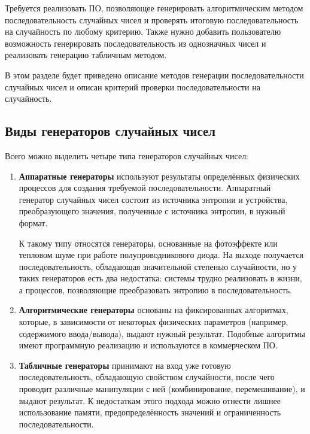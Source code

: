 Требуется реализовать ПО, позволяющее генерировать алгоритмическим методом последовательность случайных чисел и проверять итоговую последовательность на случайность по любому критерию.
Также нужно добавить пользователю возможность генерировать последовательность из однозначных чисел и реализовать генерацию табличным методом.

В этом разделе будет приведено описание методов генерации последовательности случайных чисел и описан критерий проверки последовательности на случайность.

\subsection*{Виды генераторов случайных чисел}
Всего можно выделить четыре типа генераторов случайных чисел:
\begin{enumerate}
	\item \textbf{Аппаратные генераторы} используют результаты определённых физических процессов для создания требуемой последовательности. Аппаратный генератор случайных чисел состоит из источника энтропии и устройства, преобразующего значения, полученные с источника энтропии, в нужный формат.
	
	К такому типу относятся генераторы, основанные на фотоэффекте или тепловом шуме при работе полупроводникового диода. 
	На выходе получается последовательность, обладающая значительной степенью случайности, но у таких генераторов есть два недостатка: системы трудно реализовать в жизни, а процессов, позволяющие преобразовать энтропию в последовательность.
	
	\item \textbf{Алгоритмические генераторы} основаны на фиксированных алгоритмах, которые, в зависимости от некоторых физических параметров (например, содержимого ввода/вывода), выдают нужный результат. Подобные алгоритмы имеют программную реализацию и используются в коммерческом ПО.
	
	\item \textbf{Табличные генераторы} принимают на вход уже готовую последовательность, обладающую свойством случайности, после чего проводит различные манипуляции с ней (комбинирование, перемешивание), и выдают результат.
	К недостаткам этого подхода можно отнести лишнее использование памяти, предопределённость значений и ограниченность последовательности.
\end{enumerate}



